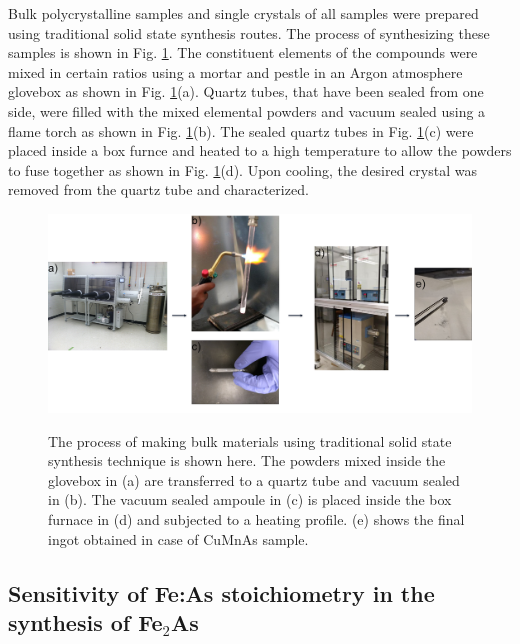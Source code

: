 \documentclass[letterpaper,10pt,doublespacing,edeposit]{uiucthesis2020}
\begin{document}
\begin{mainmatter}


Bulk polycrystalline samples and single crystals of all samples were prepared using traditional solid state synthesis routes. The process of synthesizing these samples is shown in Fig. \ref{fig:synthesis_procedure}. The constituent elements of the compounds were mixed in certain ratios using a mortar and pestle in an Argon atmosphere glovebox as shown in Fig. \ref{fig:synthesis_procedure}(a). Quartz tubes, that have been sealed from one side, were filled with the mixed elemental powders and vacuum sealed using a flame torch as shown in Fig. \ref{fig:synthesis_procedure}(b). The sealed quartz tubes in Fig. \ref{fig:synthesis_procedure}(c) were placed inside a box furnce and heated to a high temperature to allow the powders to fuse together as shown in Fig. \ref{fig:synthesis_procedure}(d). Upon cooling, the desired crystal was removed from the quartz tube and characterized.

\begin{figure}
\centering\includegraphics[width=\columnwidth]{figures/ch3/synthesis_procedure.png} \\
\caption{\label{fig:synthesis_procedure}
The process of making bulk materials using traditional solid state synthesis technique is shown here. The powders mixed inside the glovebox in (a) are transferred to a quartz tube and vacuum sealed in (b). The vacuum sealed ampoule in (c) is placed inside the box furnace in (d) and subjected to a heating profile. (e) shows the final ingot obtained in case of CuMnAs sample.
}
\end{figure}



\subsection{Sensitivity of Fe:As stoichiometry in the synthesis of Fe$_2$As}


\end{mainmatter}
\end{document}
